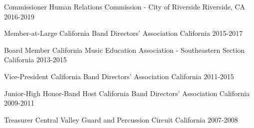 

\begin{cvhonors}
  \cvhonor
    {Commissioner} %
    {Human Relations Commission - City of Riverside} %
    {Riverside, CA} %
    {2016-2019} %

  \cvhonor
    {Member-at-Large} %
    {California Band Directors' Association} %
    {California} %
    {2015-2017} %

  \cvhonor
    {Board Member} %
    {California Music Education Association - Southeastern Section} %
    {California} %
    {2013-2015} %

  \cvhonor
    {Vice-President} %
    {California Band Directors' Association} %
    {California} %
    {2011-2015} %

  \cvhonor
    {Junior-High Honor-Band Host} %
    {California Band Directors' Association} %
    {California} %
    {2009-2011} %

  \cvhonor
    {Treasurer} %
    {Central Valley Guard and Percussion Circuit} %
    {California} %
    {2007-2008} %


\end{cvhonors}
